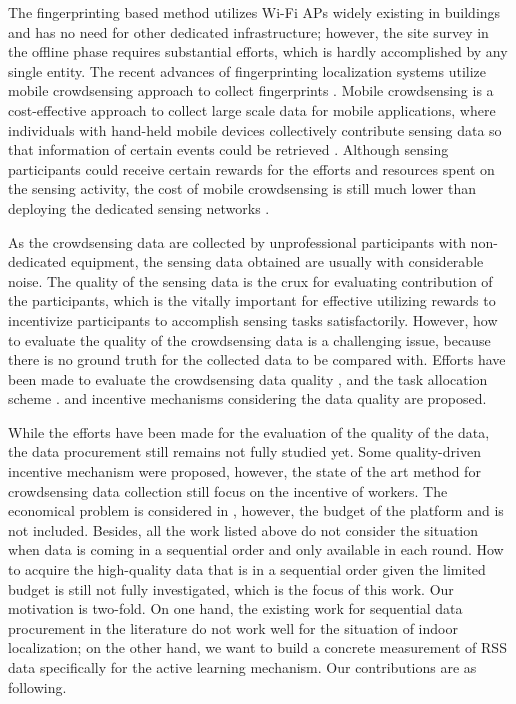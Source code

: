 \documentclass[10pt,conference,compsocconf,letterpaper]{IEEEtran}
\begin{document}
The fingerprinting based method utilizes Wi-Fi APs widely existing in buildings and has no need for other dedicated infrastructure; however, the site survey in the offline phase requires substantial efforts, which is hardly accomplished by any single entity. The recent advances of fingerprinting localization systems utilize mobile crowdsensing approach to collect fingerprints \cite{ wen2015fundamental, Chenshu14, luo2014piloc, shen2013walkie, ez10, Chintalapudi10}. Mobile crowdsensing is a cost-effective approach to collect large scale data for mobile applications, where individuals with hand-held mobile devices collectively contribute sensing data so that information of certain events could be retrieved \cite{crowdsensing, postedpricing}. Although sensing participants could receive certain rewards for the efforts and resources spent on the sensing activity, the cost of mobile crowdsensing is still much lower than deploying the dedicated sensing networks \cite{ crowdsensing}. 


As the crowdsensing data are collected by unprofessional participants with non-dedicated equipment, the sensing data obtained are usually with considerable noise. The quality of the sensing data is the crux for evaluating contribution of the participants, which is the vitally important for effective utilizing rewards to incentivize participants to accomplish sensing tasks satisfactorily. However, how to evaluate the quality of the crowdsensing data is a challenging issue, because there is no ground truth for the collected data to be compared with. Efforts have been made to evaluate the crowdsensing data quality \cite{ Crowdloc14}, and the task allocation scheme \cite{ Taskselection15, recruit}. and incentive mechanisms considering the data quality are proposed. 

While the efforts have been made for the evaluation of the quality of the data, the data procurement still remains not fully studied yet. Some quality-driven incentive mechanism\cite{Lbs2, noise,Pengdan15, incentive, Incentive2} were proposed, however, the state of the art method for crowdsensing data collection still focus on the incentive of workers. The economical problem is considered in \cite{Pengdan15}, however, the budget of the platform and is not included. Besides, all the work listed above do not consider the situation when data is coming in a sequential order and only 
available in each round. How to acquire the high-quality data that is in a sequential order given the limited budget is still not fully investigated, which is the focus of this work. Our motivation is two-fold. On one hand, the existing work for sequential data procurement in the literature \cite{abernethy2015low}do not work well for the situation of indoor localization; on the other hand, we want to build a concrete measurement of RSS data specifically for the active learning mechanism. Our contributions are as following.
\end{document}
